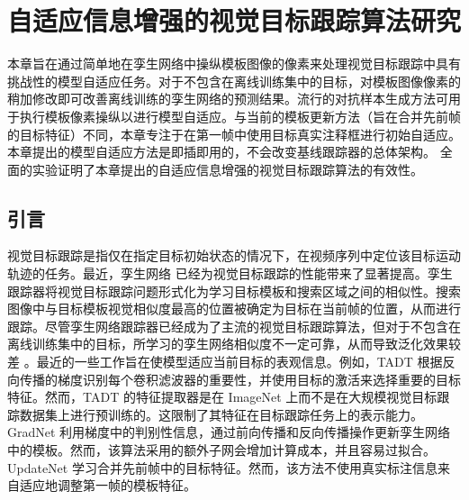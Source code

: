 \chapter{自适应信息增强的视觉目标跟踪算法研究}\label{chap:MTP}
本章旨在通过简单地在孪生网络中操纵模板图像的像素来处理视觉目标跟踪中具有挑战性的模型自适应任务。对于不包含在离线训练集中的目标，对模板图像像素的稍加修改即可改善离线训练的孪生网络的预测结果。流行的对抗样本生成方法可用于执行模板像素操纵以进行模型自适应。与当前的模板更新方法（旨在合并先前帧的目标特征）不同，本章专注于在第一帧中使用目标真实注释框进行初始自适应。本章提出的模型自适应方法是即插即用的，不会改变基线跟踪器的总体架构。
全面的实验证明了本章提出的自适应信息增强的视觉目标跟踪算法的有效性。

\section{引言}
视觉目标跟踪是指仅在指定目标初始状态的情况下，在视频序列中定位该目标运动轨迹的任务。最近，孪生网络 \cite{danelljan2019atom, SiamFC} 已经为视觉目标跟踪的性能带来了显著提高。孪生跟踪器将视觉目标跟踪问题形式化为学习目标模板和搜索区域之间的相似性。搜索图像中与目标模板视觉相似度最高的位置被确定为目标在当前帧的位置，从而进行跟踪。尽管孪生网络跟踪器已经成为了主流的视觉目标跟踪算法，但对于不包含在离线训练集中的目标，所学习的孪生网络相似度不一定可靠，从而导致泛化效果较差 \cite{Bhat_2019_ICCV}。最近的一些工作旨在使模型适应当前目标的表观信息。例如，TADT \cite{Li_2019_CVPR} 根据反向传播的梯度识别每个卷积滤波器的重要性，并使用目标的激活来选择重要的目标特征。然而，TADT 的特征提取器是在 ImageNet \cite{VID} 上而不是在大规模视觉目标跟踪数据集上进行预训练的。这限制了其特征在目标跟踪任务上的表示能力。GradNet \cite{Li_2019_ICCV} 利用梯度中的判别性信息，通过前向传播和反向传播操作更新孪生网络中的模板。然而，该算法采用的额外子网会增加计算成本，并且容易过拟合。UpdateNet \cite{Zhang_2019_ICCV} 学习合并先前帧中的目标特征。然而，该方法不使用真实标注信息来自适应地调整第一帧的模板特征。

